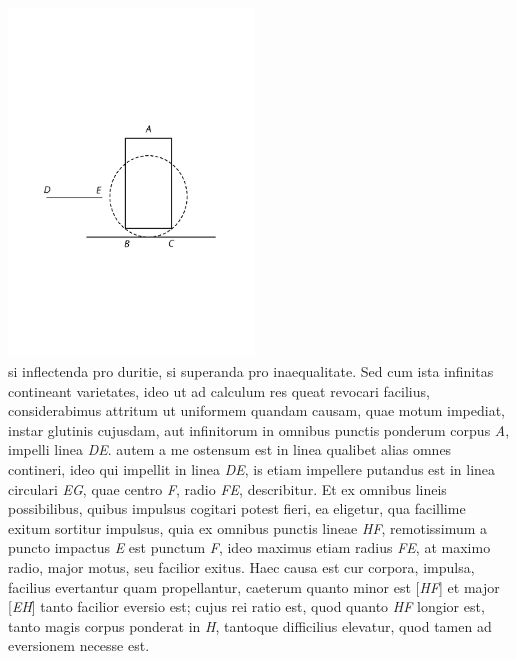 \pend
\newpage
\pstart
\centering
 \includegraphics[trim = 0mm 0mm 0mm 0mm, clip, width=0.49\textwidth]{images/lh03705_008-d2.pdf}\\
\noindent {}%
\pend
\vspace{1.5em}
\pstart \noindent si inflectenda pro duritie, si superanda pro inaequalitate. Sed cum ista infinitas contineant varietates, ideo ut ad calculum res queat revocari facilius, considerabimus attritum ut uniformem quandam causam, quae motum impediat, instar glutinis cujusdam, aut infinitorum in omnibus punctis ponderum 
corpus \textit{A}, impelli linea \textit{DE}.
autem a me ostensum est in linea qualibet alias omnes contineri, ideo qui impellit in linea \textit{DE}, is etiam impellere putandus est in linea circulari \textit{EG}, quae centro \textit{F}, radio \textit{FE}, describitur. Et ex omnibus lineis possibilibus, quibus impulsus\protect{} cogitari potest fieri, ea eligetur, qua facillime exitum sortitur impulsus\protect{}, quia ex omnibus punctis lineae \textit{HF}, remotissimum a puncto impactus \textit{E} est punctum \textit{F}, ideo maximus etiam radius \textit{FE}, at maximo radio, major motus, seu facilior exitus. Haec causa est cur corpora,  impulsa, facilius evertantur quam propellantur, caeterum quanto minor est [\textit{HF}] et major [\textit{EH}] tanto facilior eversio est; cujus rei ratio est, quod quanto \textit{HF} longior est, tanto magis corpus ponderat in \textit{H}, tantoque difficilius elevatur, quod tamen ad eversionem necesse est. 
